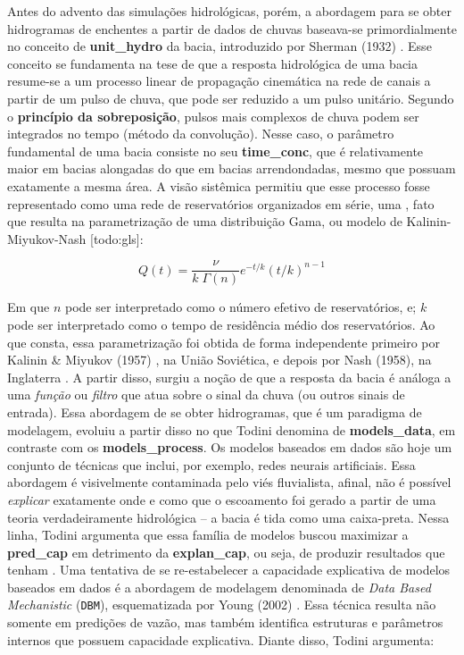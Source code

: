 \documentclass[./main.tex]{subfiles}
\begin{document}
\par Antes do advento das simulações hidrológicas, porém, a abordagem para se obter hidrogramas de enchentes a partir de dados de chuvas baseava-se primordialmente no conceito de \textbf{\gls{unit_hydro}} da bacia, introduzido por Sherman (1932) \cite{Sherman1932a}. Esse conceito se fundamenta na tese de que a resposta hidrológica de uma bacia resume-se a um processo linear de propagação cinemática na rede de canais a partir de um pulso de chuva, que pode ser reduzido a um pulso unitário. Segundo o \textbf{princípio da sobreposição}, pulsos mais complexos de chuva podem ser integrados no tempo (método da convolução). Nesse caso, o parâmetro fundamental de uma bacia consiste no seu \textbf{\gls{time_conc}}, que é relativamente maior em bacias alongadas do que em bacias arrendondadas, mesmo que possuam exatamente a mesma área. A visão sistêmica permitiu que esse processo fosse representado como uma rede de reservatórios organizados em série, uma , fato que resulta na parametrização de uma distribuição Gama, ou modelo de Kalinin-Miyukov-Nash [todo:gls]:
\begin{linenomath*}
\begin{equation}
\label{eq:kalinin}
Q(t) = \frac{\nu}{k\; \Gamma(n)} e^{-t/k} (t/k )^{n-1}
\end{equation}
\end{linenomath*}
\noindent Em que $n$ pode ser interpretado como o número efetivo de reservatórios, e; $k$ pode ser interpretado como o tempo de residência médio dos reservatórios. Ao que consta, essa parametrização foi obtida de forma independente primeiro por Kalinin \& Miyukov (1957) \cite{Kalinin1957a}, na União Soviética, e depois por Nash (1958), na Inglaterra \cite{Nash1958a}. A partir disso, surgiu a noção de que a resposta da bacia é análoga a uma \textit{função} ou \textit{filtro} que atua sobre o sinal da chuva (ou outros sinais de entrada). Essa abordagem de se obter hidrogramas, que é um \gls{paradigma} de modelagem, evoluiu a partir disso no que Todini \cite{Todini2007a} denomina de \textbf{\gls{models_data}}, em contraste com os \textbf{\gls{models_process}}. Os modelos baseados em dados são hoje um conjunto de técnicas que inclui, por exemplo, redes neurais artificiais. Essa abordagem é visivelmente contaminada pelo viés fluvialista, afinal, não é possível \textit{explicar} exatamente onde e como que o escoamento foi gerado a partir de uma teoria verdadeiramente hidrológica -- a bacia é tida como uma caixa-preta. Nessa linha, Todini argumenta que essa família de modelos buscou maximizar a \textbf{\gls{pred_cap}} em detrimento da \textbf{\gls{explan_cap}}, ou seja, de produzir resultados que tenham . Uma tentativa de se re-estabelecer a capacidade explicativa de modelos baseados em dados é a abordagem de modelagem denominada de \textit{Data Based Mechanistic} (\texttt{DBM}), esquematizada por Young (2002) \cite{Young2002a}. Essa técnica resulta não somente em predições de vazão, mas também identifica estruturas e parâmetros internos que possuem capacidade explicativa. Diante disso, Todini argumenta:
\end{document}
